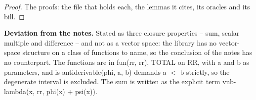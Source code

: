 %
\begin{proof}
%
The proofs: the file that holds each, the lemmas it cites, its oracles and its bill.
%
%
%
%
%
%
%
%
%
%
%
%
%
\end{proof}
%
\noindent\textbf{Deviation from the notes.} Stated as three closure properties -- sum, scalar multiple and difference -- and not as a vector space: the library has no vector-space structure on a class of functions to name, so the conclusion of the notes has no counterpart. The functions are in fun(rr, rr), TOTAL on RR, with a and b as parameters, and is-antiderivable(phi, a, b) demands a $<$ b strictly, so the degenerate interval is excluded. The sum is written as the explicit term vnb-lambda(x, rr, phi(x) + psi(x)).
%
\renewcommand{\thethm}{4.10}
